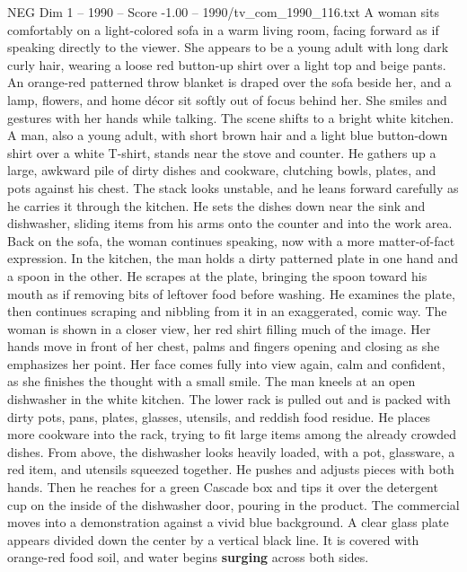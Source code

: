 \begin{textsample}{NEG Dim 1 – 1990 – Score -1.00 – 1990/tv\_com\_1990\_116.txt}  \label{ex:f1_neg_055}
A woman sits comfortably on a light-colored sofa in a warm living room, facing forward as if speaking directly to the viewer.
She appears to be a young adult with long dark curly hair, wearing a loose red button-up shirt over a light top and beige pants.
An orange-red patterned throw blanket is draped over the sofa beside her, and a lamp, flowers, and home décor sit softly out of focus behind her.
She smiles and gestures with her hands while talking.
The scene shifts to a bright white kitchen.
A man, also a young adult, with short brown hair and a light blue button-down shirt over a white T-shirt, stands near the stove and counter.
He gathers up a large, awkward pile of dirty dishes and cookware, clutching bowls, plates, and pots against his chest.
The stack looks unstable, and he leans forward carefully as he carries it through the kitchen.
He sets the dishes down near the sink and dishwasher, sliding items from his arms onto the counter and into the work area.
Back on the sofa, the woman continues speaking, now with a more matter-of-fact expression.
In the kitchen, the man holds a dirty patterned plate in one hand and a spoon in the other.
He scrapes at the plate, bringing the spoon toward his mouth as if removing bits of leftover food before washing.
He examines the plate, then continues scraping and nibbling from it in an exaggerated, comic way.
The woman is shown in a closer view, her red shirt filling much of the image.
Her hands move in front of her chest, palms and fingers opening and closing as she emphasizes her point.
Her face comes fully into view again, calm and confident, as she finishes the thought with a small smile.
The man kneels at an open dishwasher in the white kitchen.
The lower rack is pulled out and is packed with dirty pots, pans, plates, glasses, utensils, and reddish food residue.
He places more cookware into the rack, trying to fit large items among the already crowded dishes.
From above, the dishwasher looks heavily loaded, with a pot, glassware, a red item, and utensils squeezed together.
He pushes and adjusts pieces with both hands.
Then he reaches for a green Cascade box and tips it over the detergent cup on the inside of the dishwasher door, pouring in the product.
The commercial moves into a demonstration against a vivid blue background.
A clear glass plate appears divided down the center by a vertical black line.
It is covered with orange-red food soil, and water begins \textbf{surging} across both sides.

\end{textsample}

